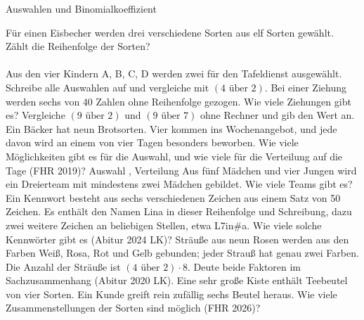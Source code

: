 \setcounter{aufgabe}{9}

\begin{aufgabe}{Auswahlen und Binomialkoeffizient}
\begin{teile}
\teil Für einen Eisbecher werden drei verschiedene Sorten aus elf Sorten gewählt. Zählt die Reihenfolge der Sorten? \\  \\ 
\teil Aus den vier Kindern A, B, C, D werden zwei für den Tafeldienst ausgewählt. Schreibe alle Auswahlen auf und vergleiche mit $(4 \text{ über } 2)$. \leerfeld
\teil Bei einer Ziehung werden sechs von 40 Zahlen ohne Reihenfolge gezogen. Wie viele Ziehungen gibt es? \leerfeld
\teil Vergleiche $(9 \text{ über } 2)$ und $(9 \text{ über } 7)$ ohne Rechner und gib den Wert an. \leerfeld
\teil Ein Bäcker hat neun Brotsorten. Vier kommen ins Wochenangebot, und jede davon wird an einem von vier Tagen besonders beworben. Wie viele Möglichkeiten gibt es für die Auswahl, und wie viele für die Verteilung auf die Tage \hfill (FHR 2019)? Auswahl \leerfeld , Verteilung \leerfeld
\teil Aus fünf Mädchen und vier Jungen wird ein Dreierteam mit mindestens zwei Mädchen gebildet. Wie viele Teams gibt es? \leerfeld
\teil Ein Kennwort besteht aus sechs verschiedenen Zeichen aus einem Satz von 50 Zeichen. Es enthält den Namen Lina in dieser Reihenfolge und Schreibung, dazu zwei weitere Zeichen an beliebigen Stellen, etwa L7in\#a. Wie viele solche Kennwörter gibt es \hfill (Abitur 2024 LK)? \leerfeld
\teil Sträuße aus neun Rosen werden aus den Farben Weiß, Rosa, Rot und Gelb gebunden; jeder Strauß hat genau zwei Farben. Die Anzahl der Sträuße ist $(4 \text{ über } 2) \cdot 8$. Deute beide Faktoren im Sachzusammenhang \hfill (Abitur 2020 LK).
\teil Eine sehr große Kiste enthält Teebeutel von vier Sorten. Ein Kunde greift rein zufällig sechs Beutel heraus. Wie viele Zusammenstellungen der Sorten sind möglich \hfill (FHR 2026)? \leerfeld
\end{teile}
\end{aufgabe}

